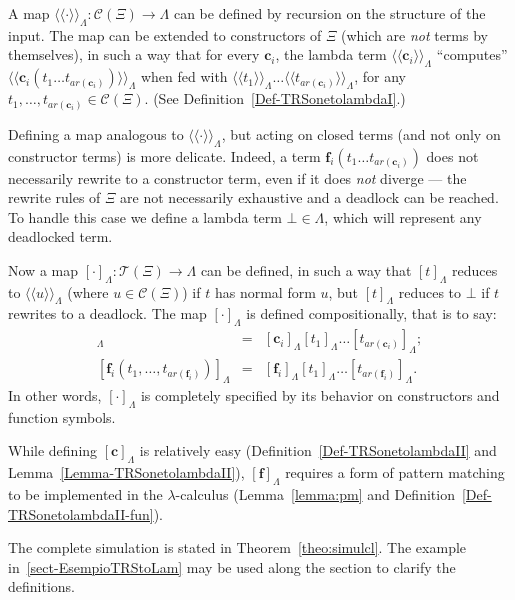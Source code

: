 \documentclass{LMCS}
\newcommand{\funone}{\mathbf{f}}
\newcommand{\conone}{\mathbf{c}}
\newcommand{\termone}{t}
\newcommand{\termtwo}{u}
\newcommand{\TRSonetolambdaI}[1]{\langle\!\langle #1\rangle\!\rangle_{\Lambdaterms}}
\newcommand{\TRSonetolambdaII}[1]{[#1]_{\Lambdaterms}}
\newcommand{\errorterm}{\bot}
\newcommand{\arity}[1]{\mathit{ar}(#1)}
\newcommand{\Lambdaterms}{\Lambda}
\newcommand{\TRSone}{\Xi}
\newcommand{\TRStermsp}[1]{\mathcal{T}(#1)}
\newcommand{\TRScontermsp}[1]{\mathcal{C}(#1)}
\newenvironment{varitemize}
{
\begin{list}{\labelitemi}
{\setlength{\itemsep}{0.0mm}
 \setlength{\topsep}{0.0mm}
 \setlength{\parindent}{0.0mm}
 \setlength{\parskip}{0.0mm}
 \setlength{\parsep}{0.0mm}
 \setlength{\partopsep}{0.0mm}
 \setlength{\leftmargin}{15pt}
 \setlength{\labelsep}{5pt}
 \setlength{\labelwidth}{10pt}}}
{
 \end{list} 
}
\begin{document}
\begin{varitemize}
\item
  A map $\TRSonetolambdaI{\cdot}:\TRScontermsp{\TRSone}\rightarrow\Lambdaterms$ can
  be defined by recursion on the structure of the input. The map can be
  extended to constructors of $\TRSone$ (which are \emph{not} terms by themselves),
  in such a way that for every $\conone_i$, the lambda term $\TRSonetolambdaI{\conone_i}$
  ``computes'' $\TRSonetolambdaI{\conone_i(\termone_1\ldots\termone_{\arity{\conone_i}})}$
  when fed with $\TRSonetolambdaI{\termone_1}\ldots\TRSonetolambdaI{\termone_{\arity{\conone_i}}}$,
  for any $\termone_1,\ldots,\termone_{\arity{\conone_i}}\in\TRScontermsp{\TRSone}$. (See Definition~\ref{Def-TRSonetolambdaI}.)
\item
  Defining a map analogous to $\TRSonetolambdaI{\cdot}$, but acting on closed terms (and not only on 
  constructor terms) is more delicate. Indeed, a term 
  $\funone_i(\termone_1\ldots\termone_{\arity{\conone_i}})$ 
  does not necessarily rewrite to a constructor term,
  even if it does \emph{not} diverge ---
  the rewrite rules of $\TRSone$ are not necessarily exhaustive and a deadlock
  can be reached. To handle this case we define a lambda term $\errorterm\in\Lambdaterms$, which 
  will represent any deadlocked term.
\item
  Now a map $\TRSonetolambdaII{\cdot}:\TRStermsp{\TRSone}\rightarrow\Lambdaterms$
  can be defined, in such a way that $\TRSonetolambdaII{\termone}$ reduces
  to $\TRSonetolambdaI{\termtwo}$ (where $\termtwo\in\TRScontermsp{\TRSone}$) if 
  $\termone$ has normal form $\termtwo$, but $\TRSonetolambdaII{\termone}$ reduces to $\errorterm$
  if $\termone$ rewrites to a deadlock. The map $\TRSonetolambdaII{\cdot}$
  is defined compositionally, that is to say:
  \begin{eqnarray*}
    \TRSonetolambdaII{\conone(\termone_1,\ldots,\termone_{\arity{\conone_i}})}&=&\TRSonetolambdaII{\conone_i}
    \TRSonetolambdaII{\termone_1}\ldots\TRSonetolambdaII{\termone_{\arity{\conone_i}}};\\
    \TRSonetolambdaII{\funone_i(\termone_1,\ldots,\termone_{\arity{\funone_i}})}&=&\TRSonetolambdaII{\funone_i}
    \TRSonetolambdaII{\termone_1}\ldots\TRSonetolambdaII{\termone_{\arity{\funone_i}}}.
  \end{eqnarray*}
  In other words, $\TRSonetolambdaII{\cdot}$ is completely specified by its
  behavior on constructors and function symbols.
\item
  While defining $\TRSonetolambdaII{\conone}$ is relatively easy 
  (Definition~\ref{Def-TRSonetolambdaII} and Lemma~\ref{Lemma-TRSonetolambdaII}),
  $\TRSonetolambdaII{\funone}$ requires a form of pattern matching
  to be implemented in the $\lambda$-calculus (Lemma~\ref{lemma:pm} and Definition~\ref{Def-TRSonetolambdaII-fun}).
\item The complete simulation is stated in Theorem~\ref{theo:simulcl}. The example in~\ref{sect-EsempioTRStoLam} may be used along the section to clarify the definitions.
\end{varitemize}
\end{document}
